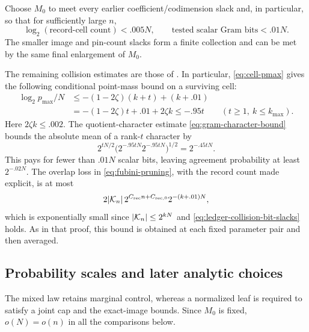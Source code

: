 Choose \(M_0\) to meet every earlier coefficient/codimension slack
and, in particular, so that for sufficiently large \(n\),
\begin{equation}
 \log_2(\text{record-cell count})<.005N,\qquad
 \text{tested scalar Gram bits}<.01N.
 \label{eq:ledger-collision-bit-slacks}
\end{equation}
The smaller image and pin-count slacks form a finite collection
and can be met by the same final enlargement of \(M_0\).

The remaining collision estimates are those of
. In particular, \eqref{eq:cell-pmax} gives
the following conditional point-mass bound on a surviving cell:
\[
 \begin{split}
 \log_2 p_{\max}/N
  &\le -(1-2\zeta)(k+t)+(k+.01)\\
  &=-(1-2\zeta)t+.01+2\zeta k
       \le-.95t
       \qquad(t\ge1,\ k\le k_{\max}).
 \end{split}
\]
Here \(2\zeta k\le.002\).
The quotient-character estimate \eqref{eq:gram-character-bound}
bounds the absolute mean of a rank-\(t\) character by
\[
       2^{tN/2}
       \bigl(2^{-.95tN}2^{-.95tN}\bigr)^{1/2}
             =2^{-.45tN}.
\]
This pays for fewer than \(.01N\) scalar bits, leaving agreement
probability at least \(2^{-.02N}\).
The overlap loss in \eqref{eq:fubini-pruning}, with the record count
made explicit, is at most
\[
 2|\mathcal K_n|\,2^{C_{\mathrm{rec}}n+C_{\mathrm{rec},0}}
       2^{-(k+.01)N},
\]
which is exponentially small since \(|\mathcal K_n|\le2^{kN}\) and
\eqref{eq:ledger-collision-bit-slacks} holds.
As in that proof, this bound is obtained at each fixed parameter
pair and then averaged.

\subsection{Probability scales and later analytic choices}
\label{sec:probability-scales}

The mixed law retains marginal control, whereas a normalized leaf
is required to satisfy a joint cap and the exact-image bounds.
Since \(M_0\) is fixed, \(o(N)=o(n)\) in all the comparisons below.

